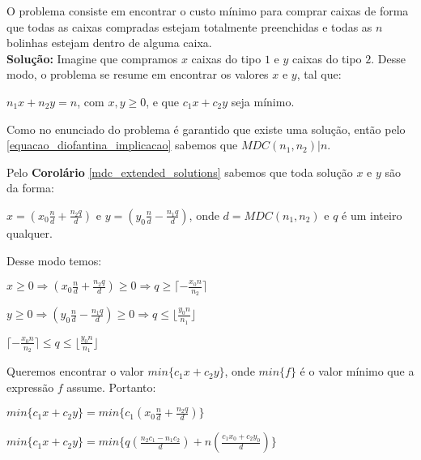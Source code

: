 O problema consiste em encontrar o custo mínimo para comprar caixas de forma que todas as caixas compradas estejam totalmente
 preenchidas e todas as $n$ bolinhas estejam dentro de alguma caixa.
\\

\textbf{Solução:}
Imagine que compramos $x$ caixas do tipo $1$ e $y$ caixas do tipo $2$. Desse modo, o problema se resume em encontrar os valores $x$ e $y$, tal que: 
\newline

$n_1x + n_2y = n$, com $x,y\geq 0$, e que $c_1x+c_2y$ seja mínimo.
\newline 

Como no enunciado do problema é garantido que existe uma solução, então pelo \autoref{equacao_diofantina_implicacao} sabemos que $MDC(n_1,n_2) | n$.

Pelo \textbf{Corolário} \autoref{mdc_extended_solutions} sabemos que toda solução $x$ e $y$ são da forma:

$x=(x_0\frac{n}{d} + \frac{n_2q}{d})$ e $y =(y_0\frac{n}{d} - \frac{n_1q}{d})$, onde $d = MDC(n_1,n_2)$ e $q$ é um inteiro qualquer.

Desse modo temos:
\newline

$x\geq0 \Rightarrow (x_0\frac{n}{d} + \frac{n_2q}{d})\geq 0 \Rightarrow q \geq \lceil -\frac{x_0n}{n_2} \rceil$
\newline

$y\geq0 \Rightarrow (y_0\frac{n}{d} - \frac{n_1q}{d}) \geq 0 \Rightarrow q \leq \lfloor \frac{y_0n}{n_1} \rfloor$
\newline

$\lceil -\frac{x_0n}{n_2} \rceil \leq q \leq \lfloor \frac{y_0n}{n_1} \rfloor$
\newline

Queremos encontrar o valor $min\{c_1x+c_2y\}$, onde $min\{f\}$ é o valor mínimo que a expressão $f$ assume. Portanto:
\newline

$min\{c_1x+c_2y\} = min\big\{c_1(x_0\frac{n}{d} + \frac{n_2q}{d})\big\}$ 
\newline

$min\{c_1x+c_2y\} = min\big\{q(\frac{n_2c_1 - n_1c_2}{d}) + n(\frac{c_1x_0+c_2y_0}{d})\big\}$ 
\newline

